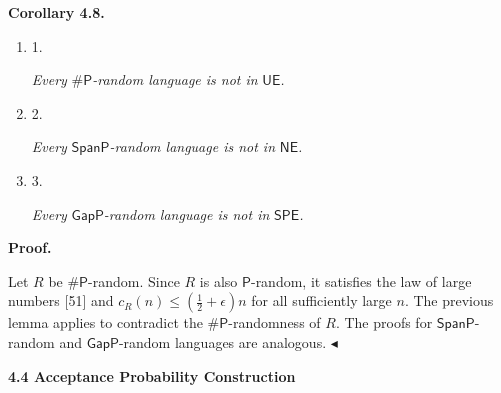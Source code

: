 

\par\medskip\noindent\textbf{
\textbf{Corollary 4.8}\textbf{.}
}\par



\begin{enumerate}


\item[] 
1. 


\emph{Every }${\mathsf{\#}\mathsf{P}}$\emph{-random language is not in }$\mathsf{UE}$\emph{.}\par





\item[] 
2. 


\emph{Every }$\mathsf{SpanP}$\emph{-random language is not in }$\mathsf{NE}$\emph{.}\par





\item[] 
3. 


\emph{Every }$\mathsf{GapP}$\emph{-random language is not in }$\mathsf{SPE}$\emph{.}\par





\end{enumerate}







\par\medskip\noindent\textbf{Proof.}\par




Let $R$ be ${\mathsf{\#}\mathsf{P}}$-random. Since $R$ is also $\mathsf{P}$-random, it satisfies the law of large numbers [51] and $c_{R}(n)\leq(\frac{1}{2}+\epsilon)n$ for all sufficiently large $n$. The previous lemma applies to contradict the ${\mathsf{\#}\mathsf{P}}$-randomness of $R$. The proofs for $\mathsf{SpanP}$-random and $\mathsf{GapP}$-random languages are analogous.
$\blacktriangleleft$\par






\par\medskip\noindent\textbf{
4.4 Acceptance Probability Construction}\par




